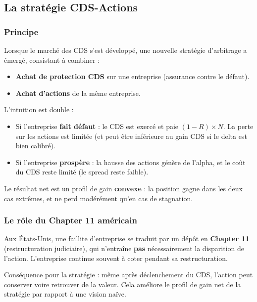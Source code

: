 \subsection{La stratégie CDS-Actions}

\subsubsection{Principe}

Lorsque le marché des CDS s'est développé, une nouvelle stratégie d'arbitrage a émergé, consistant à combiner :

\begin{itemize}
    \item \textbf{Achat de protection CDS} sur une entreprise (assurance contre le défaut).
    \item \textbf{Achat d'actions} de la même entreprise.
\end{itemize}

L'intuition est double :
\begin{itemize}
    \item Si l'entreprise \textbf{fait défaut} : le CDS est exercé et paie $(1-R) \times N$. La perte sur les actions est limitée (et peut être inférieure au gain CDS si le delta est bien calibré).
    \item Si l'entreprise \textbf{prospère} : la hausse des actions génère de l'alpha, et le coût du CDS reste limité (le spread reste faible).
\end{itemize}

Le résultat net est un profil de gain \textbf{convexe} : la position gagne dans les deux cas extrêmes, et ne perd modérément qu'en cas de stagnation.

\subsubsection{Le rôle du Chapter 11 américain}

\begin{remarque}
Aux États-Unis, une faillite d'entreprise se traduit par un dépôt en \textbf{Chapter 11} (restructuration judiciaire), qui n'entraîne \textbf{pas} nécessairement la disparition de l'action. L'entreprise continue souvent à coter pendant sa restructuration.

Conséquence pour la stratégie : même après déclenchement du CDS, l'action peut conserver voire retrouver de la valeur. Cela améliore le profil de gain net de la stratégie par rapport à une vision naïve.
\end{remarque}


